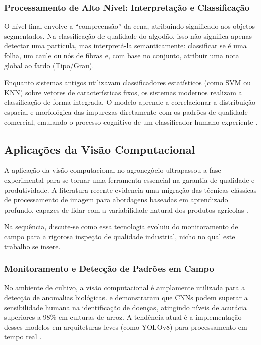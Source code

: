     \subsubsection{Processamento de Alto Nível: Interpretação e Classificação}
    
        O nível final envolve a ``compreensão'' da cena, atribuindo significado aos objetos segmentados. Na classificação de qualidade do algodão, isso não significa apenas detectar uma partícula, mas interpretá-la semanticamente: classificar se é uma folha, um caule ou nós de fibras e, com base no conjunto, atribuir uma nota global ao fardo (Tipo/Grau).
        
        Enquanto sistemas antigos utilizavam classificadores estatísticos (como SVM ou KNN) sobre vetores de características fixos, os sistemas modernos realizam a classificação de forma integrada. O modelo aprende a correlacionar a distribuição espacial e morfológica das impurezas diretamente com os padrões de qualidade comercial, emulando o processo cognitivo de um classificador humano experiente \cite{pacal2024systematic}.

\subsection{Aplicações da Visão Computacional}

    A aplicação da visão computacional no agronegócio ultrapassou a fase experimental para se tornar uma ferramenta essencial na garantia de qualidade e produtividade. A literatura recente evidencia uma migração das técnicas clássicas de processamento de imagem para abordagens baseadas em aprendizado profundo, capazes de lidar com a variabilidade natural dos produtos agrícolas \cite{patricio2018,tian2020}.
    
    Na sequência, discute-se como essa tecnologia evoluiu do monitoramento de campo para a rigorosa inspeção de qualidade industrial, nicho no qual este trabalho se insere.

    \subsubsection{Monitoramento e Detecção de Padrões em Campo}

        No ambiente de cultivo, a visão computacional é amplamente utilizada para a detecção de anomalias biológicas.  e  demonstraram que CNNs podem superar a sensibilidade humana na identificação de doenças, atingindo níveis de acurácia superiores a 98\% em culturas de arroz. A tendência atual é a implementação desses modelos em arquiteturas leves (como YOLOv8) para processamento em tempo real \cite{shwetha2024}.
        
